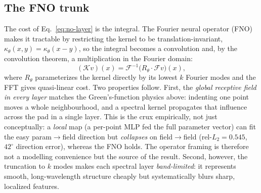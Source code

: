 \documentclass[conference]{IEEEtran}
\newcommand{\relL}{\mathrm{rel}\text{-}L_2}
\begin{document}
\subsection{The FNO trunk}\label{sec:method-fno}
The cost of Eq.~\eqref{eq:no-layer} is the integral. The Fourier neural
operator (FNO)~\cite{li2021fno} makes it tractable by restricting the kernel to
be translation-invariant, $\kappa_\theta(x,y)=\kappa_\theta(x-y)$, so the
integral becomes a convolution and, by the convolution theorem, a
multiplication in the Fourier domain:
\begin{equation}
(\mathcal{K}v)(x) = \mathcal{F}^{-1}\!\big(R_\theta \cdot \mathcal{F}v\big)(x),
\end{equation}
where $R_\theta$ parameterizes the kernel directly by its lowest $k$ Fourier
modes and the FFT gives quasi-linear cost. Two properties follow. First, the
\emph{global receptive field in every layer} matches the Green's-function
physics above: indenting one point moves a whole neighbourhood, and a spectral
kernel propagates that influence across the pad in a single layer. This is the
crux empirically, not just conceptually: a \emph{local} map (a per-point MLP
fed the full parameter vector) can fit the easy param$\to$field direction but
\emph{collapses} on field$\to$field ($\relL=0.545$, $42^\circ$ direction
error), whereas the FNO holds. The operator framing is therefore not a
modelling convenience but the source of the result. Second, however, the
truncation to $k$ modes makes each spectral layer \emph{band-limited}: it
represents smooth, long-wavelength structure cheaply but systematically blurs
sharp, localized features.
\end{document}
